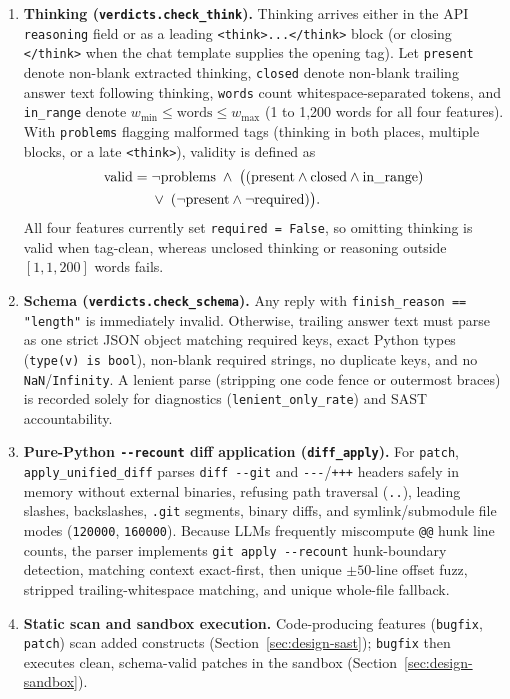 \documentclass[conference]{IEEEtran}
\begin{document}
\begin{enumerate}
\item \textbf{Thinking (\texttt{verdicts.\allowbreak{}check\_\allowbreak{}think}).} Thinking arrives either in the API \texttt{reasoning} field or as a leading \texttt{<think>...</think>} block (or closing \texttt{</think>} when the chat template supplies the opening tag). Let \texttt{present} denote non-blank extracted thinking, \texttt{closed} denote non-blank trailing answer text following thinking, \texttt{words} count whitespace-separated tokens, and \texttt{in\_\allowbreak{}range} denote $w_{\min} \le \text{words} \le w_{\max}$ (1 to 1,200 words for all four features). With \texttt{problems} flagging malformed tags (thinking in both places, multiple blocks, or a late \texttt{<think>}), validity is defined as
\begin{equation}
\label{eq:think}
\begin{split}
\text{valid} =\; &\neg \text{problems} \;\land\; \big((\text{present} \land \text{closed} \land \text{in\_\allowbreak{}range}) \\
&\lor\; (\neg \text{present} \land \neg \text{required})\big).
\end{split}
\end{equation}
All four features currently set \texttt{required = False}, so omitting thinking is valid when tag-clean, whereas unclosed thinking or reasoning outside $[1, 1{,}200]$ words fails.
\item \textbf{Schema (\texttt{verdicts.\allowbreak{}check\_\allowbreak{}schema}).} Any reply with \texttt{finish\_\allowbreak{}reason == "length"} is immediately invalid. Otherwise, trailing answer text must parse as one strict JSON object matching required keys, exact Python types (\texttt{type(v) is bool}), non-blank required strings, no duplicate keys, and no \texttt{NaN}/\texttt{Infinity}. A lenient parse (stripping one code fence or outermost braces) is recorded solely for diagnostics (\texttt{lenient\_\allowbreak{}only\_\allowbreak{}rate}) and SAST accountability.
\item \textbf{Pure-Python \texttt{-{}-{}recount} diff application (\texttt{diff\_\allowbreak{}apply}).} For \texttt{patch}, \texttt{apply\_\allowbreak{}unified\_\allowbreak{}diff} parses \texttt{diff -{}-{}git} and \texttt{-{}-{}-}/\texttt{+++} headers safely in memory without external binaries, refusing path traversal (\texttt{..}), leading slashes, backslashes, \texttt{.git} segments, binary diffs, and symlink/submodule file modes (\texttt{120000}, \texttt{160000}). Because LLMs frequently miscompute \texttt{@@} hunk line counts, the parser implements \texttt{git apply -{}-{}recount} hunk-boundary detection, matching context exact-first, then unique $\pm 50$-line offset fuzz, stripped trailing-whitespace matching, and unique whole-file fallback.
\item \textbf{Static scan and sandbox execution.} Code-producing features (\texttt{bugfix}, \texttt{patch}) scan added constructs (Section~\ref{sec:design-sast}); \texttt{bugfix} then executes clean, schema-valid patches in the sandbox (Section~\ref{sec:design-sandbox}).
\end{enumerate}
\end{document}
